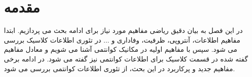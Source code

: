 \section{مقدمه}

در این فصل به بیان دقیق ریاضی مفاهیم مورد نیاز برای ادامه بحث می پردازیم. ابتدا مفاهیم اطلاعات، آنتروپی، ظرفیت، وفاداری و ... در تئوری اطلاعات کلاسیک بررسی می شود. سپس با مفاهیم اولیه در مکانیک کوانتمی آشنا می شویم و معادل مفاهیم گفته شده در قسمت کلاسیک برای اطلاعات کوانتمی نیز گفته می شود. در ادامه برخی  مفاهیم جدید و پرکاربرد در این بحث، از تئوری اطلاعات کوانتمی بررسی می شود.